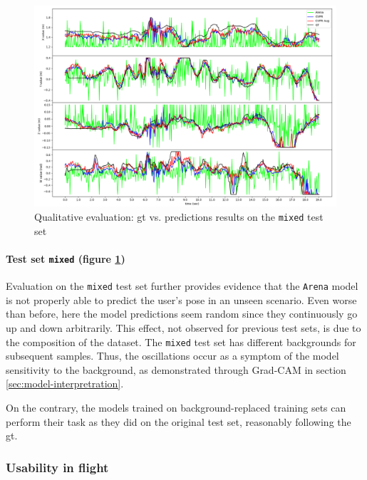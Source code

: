 \begin{figure}[H]
	\centering
	\includegraphics[width=1 \textwidth]{"contents/images/06-gtpred-mixed"}
	\caption[Qualitative evaluation: \gls{gt} vs. predictions results on the \texttt{mixed} test set]{Qualitative evaluation: \gls{gt} vs. predictions results on the \texttt{mixed} test set}
	\label{fig:ql-gtpred-mixed}
\end{figure}

\paragraph*{Test set \texttt{mixed} (figure \ref{fig:ql-gtpred-mixed})}

Evaluation on the \texttt{mixed} test set further provides evidence that the \texttt{Arena} model is not properly able to predict the user's pose in an unseen scenario. Even worse than before, here the model predictions seem random since they continuously go up and down arbitrarily. This effect, not observed for previous test sets, is due to the composition of the dataset. The \texttt{mixed} test set has different backgrounds for subsequent samples. Thus, the oscillations occur as a symptom of the model sensitivity to the background, as demonstrated through Grad-CAM in section \ref{sec:model-interpretration}.

On the contrary, the models trained on background-replaced training sets can perform their task as they did on the original test set, reasonably following the \gls{gt}.



\subsubsection*{Usability in flight}

